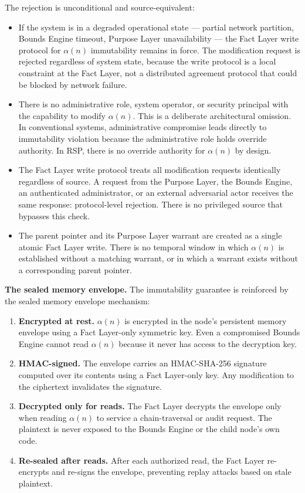 The rejection is unconditional and source-equivalent:

\begin{itemize}
    \item[\textbf{Failure resilience.}] If the system is in a degraded operational state --- partial network partition, Bounds Engine timeout, Purpose Layer unavailability --- the Fact Layer write protocol for $\alpha(n)$ immutability remains in force. The modification request is rejected regardless of system state, because the write protocol is a local constraint at the Fact Layer, not a distributed agreement protocol that could be blocked by network failure.
    \item[\textbf{Administrative override absence.}] There is no administrative role, system operator, or security principal with the capability to modify $\alpha(n)$. This is a deliberate architectural omission. In conventional systems, administrative compromise leads directly to immutability violation because the administrative role holds override authority. In RSP, there is no override authority for $\alpha(n)$ by design.
    \item[\textbf{Source-equivalence.}] The Fact Layer write protocol treats all modification requests identically regardless of source. A request from the Purpose Layer, the Bounds Engine, an authenticated administrator, or an external adversarial actor receives the same response: protocol-level rejection. There is no privileged source that bypasses this check.
    \item[\textbf{Atomic warrant-pointer creation.}] The parent pointer and its Purpose Layer warrant are created as a single atomic Fact Layer write. There is no temporal window in which $\alpha(n)$ is established without a matching warrant, or in which a warrant exists without a corresponding parent pointer.
\end{itemize}

\medskip
\noindent\textbf{The sealed memory envelope.} The immutability guarantee is reinforced by the sealed memory envelope mechanism:

\begin{enumerate}
    \item \textbf{Encrypted at rest.} $\alpha(n)$ is encrypted in the node's persistent memory envelope using a Fact Layer-only symmetric key. Even a compromised Bounds Engine cannot read $\alpha(n)$ because it never has access to the decryption key.
    \item \textbf{HMAC-signed.} The envelope carries an HMAC-SHA-256 signature computed over its contents using a Fact Layer-only key. Any modification to the ciphertext invalidates the signature.
    \item \textbf{Decrypted only for reads.} The Fact Layer decrypts the envelope only when reading $\alpha(n)$ to service a chain-traversal or audit request. The plaintext is never exposed to the Bounds Engine or the child node's own code.
    \item \textbf{Re-sealed after reads.} After each authorized read, the Fact Layer re-encrypts and re-signs the envelope, preventing replay attacks based on stale plaintext.
\end{enumerate}

